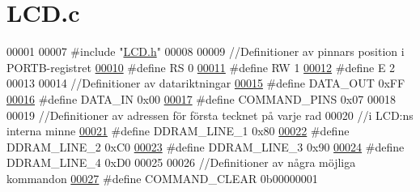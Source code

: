 \hypertarget{_l_c_d_8c_source}{}\section{L\+C\+D.\+c}
\label{_l_c_d_8c_source}

\begin{DoxyCode}
00001 
00007 \textcolor{preprocessor}{#include "\hyperlink{_l_c_d_8h}{LCD.h}"}
00008 
00009 \textcolor{comment}{//Definitioner av pinnars position i PORTB-registret}
\hypertarget{_l_c_d_8c_source.tex_l00010}{}\hyperlink{_l_c_d_8c_af8903d8eea3868940c60af887473b152}{00010} \textcolor{preprocessor}{#define RS 0}
\hypertarget{_l_c_d_8c_source.tex_l00011}{}\hyperlink{_l_c_d_8c_afc4ded33ac0ca43defcce639e965748a}{00011} \textcolor{preprocessor}{#define RW 1}
\hypertarget{_l_c_d_8c_source.tex_l00012}{}\hyperlink{_l_c_d_8c_a07484107e6d9fdf38b53edf631d6511d}{00012} \textcolor{preprocessor}{#define E  2}
00013 
00014 \textcolor{comment}{//Definitioner av datariktningar}
\hypertarget{_l_c_d_8c_source.tex_l00015}{}\hyperlink{_l_c_d_8c_abfb497db759edfde127952c40722ddf3}{00015} \textcolor{preprocessor}{#define DATA\_OUT        0xFF}
\hypertarget{_l_c_d_8c_source.tex_l00016}{}\hyperlink{_l_c_d_8c_abebff40b775e10e37faa4ec7b45d6a89}{00016} \textcolor{preprocessor}{#define DATA\_IN         0x00}
\hypertarget{_l_c_d_8c_source.tex_l00017}{}\hyperlink{_l_c_d_8c_a05f5ec448343537aca2f08c5eb3eeaab}{00017} \textcolor{preprocessor}{#define COMMAND\_PINS    0x07}
00018 
00019 \textcolor{comment}{//Definitioner av adressen för första tecknet på varje rad}
00020 \textcolor{comment}{//i LCD:ns interna minne }
\hypertarget{_l_c_d_8c_source.tex_l00021}{}\hyperlink{_l_c_d_8c_acc9e762cf3909d10f4c35e47e7c0f2e8}{00021} \textcolor{preprocessor}{#define DDRAM\_LINE\_1    0x80}
\hypertarget{_l_c_d_8c_source.tex_l00022}{}\hyperlink{_l_c_d_8c_a99ff4cbdf292fa1d55ed18e57d07a139}{00022} \textcolor{preprocessor}{#define DDRAM\_LINE\_2    0xC0}
\hypertarget{_l_c_d_8c_source.tex_l00023}{}\hyperlink{_l_c_d_8c_aee61787ba0a481741523399b51b969ce}{00023} \textcolor{preprocessor}{#define DDRAM\_LINE\_3    0x90}
\hypertarget{_l_c_d_8c_source.tex_l00024}{}\hyperlink{_l_c_d_8c_ac4b6edb4691748f93245ae9eb802ea55}{00024} \textcolor{preprocessor}{#define DDRAM\_LINE\_4    0xD0}
00025 
00026 \textcolor{comment}{//Definitioner av några möjliga kommandon }
\hypertarget{_l_c_d_8c_source.tex_l00027}{}\hyperlink{_l_c_d_8c_a5d12bd35af7836eba7538bf6e71a050d}{00027} \textcolor{preprocessor}{#define COMMAND\_CLEAR                   0b00000001}

\end{DoxyCode}
